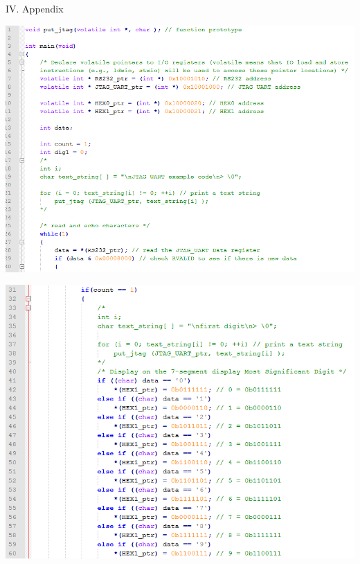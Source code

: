 \documentclass{article}
\newenvironment{Figure}
  {\par\medskip\noindent\ignorespaces\minipage{\linewidth}}
  {\endminipage\par\medskip}
\begin{document}


\begin{center}
{\large IV. Appendix }
\end{center}

\begin{Figure}
 \centering
 \includegraphics[width=\linewidth]{c1.png}
\end{Figure}

\begin{Figure}
 \centering
 \includegraphics[width=\linewidth]{c2.png}
\end{Figure}
\end{document}
